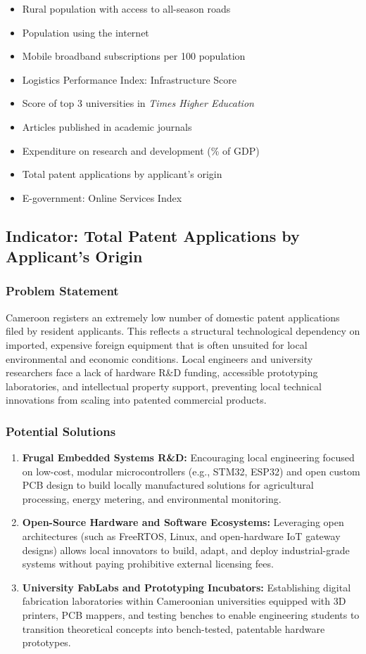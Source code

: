 \documentclass[11pt, a4paper]{article}
\begin{document}
\begin{itemize}
  \item Rural population with access to all-season roads
  \item Population using the internet
  \item Mobile broadband subscriptions per 100 population
  \item Logistics Performance Index: Infrastructure Score
  \item Score of top 3 universities in \textit{Times Higher Education}
  \item Articles published in academic journals
  \item Expenditure on research and development (\% of GDP)
  \item Total patent applications by applicant's origin
  \item E-government: Online Services Index
\end{itemize}

\subsection{Indicator: Total Patent Applications by Applicant's Origin}

\subsubsection*{Problem Statement}
Cameroon registers an extremely low number of domestic patent applications filed by resident applicants. This reflects a structural technological dependency on imported, expensive foreign equipment that is often unsuited for local environmental and economic conditions. Local engineers and university researchers face a lack of hardware R\&D funding, accessible prototyping laboratories, and intellectual property support, preventing local technical innovations from scaling into patented commercial products.

\subsubsection*{Potential Solutions}
\begin{enumerate}
  \item \textbf{Frugal Embedded Systems R\&D:} Encouraging local engineering focused on low-cost, modular microcontrollers (e.g., STM32, ESP32) and open custom PCB design to build locally manufactured solutions for agricultural processing, energy metering, and environmental monitoring.
  \item \textbf{Open-Source Hardware and Software Ecosystems:} Leveraging open architectures (such as FreeRTOS, Linux, and open-hardware IoT gateway designs) allows local innovators to build, adapt, and deploy industrial-grade systems without paying prohibitive external licensing fees.
  \item \textbf{University FabLabs and Prototyping Incubators:} Establishing digital fabrication laboratories within Cameroonian universities equipped with 3D printers, PCB mappers, and testing benches to enable engineering students to transition theoretical concepts into bench-tested, patentable hardware prototypes.
\end{enumerate}
\end{document}
